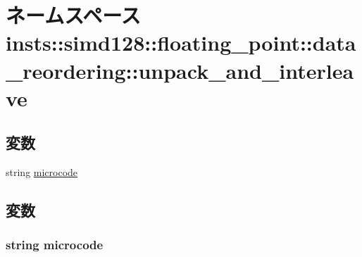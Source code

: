 \hypertarget{namespaceinsts_1_1simd128_1_1floating__point_1_1data__reordering_1_1unpack__and__interleave}{
\section{ネームスペース insts::simd128::floating\_\-point::data\_\-reordering::unpack\_\-and\_\-interleave}
\label{namespaceinsts_1_1simd128_1_1floating__point_1_1data__reordering_1_1unpack__and__interleave}
}
\subsection*{変数}
\begin{DoxyCompactItemize}
\item 
string \hyperlink{namespaceinsts_1_1simd128_1_1floating__point_1_1data__reordering_1_1unpack__and__interleave_a770f11a173e99389a8802f0107ed8f52}{microcode}
\end{DoxyCompactItemize}


\subsection{変数}
\hypertarget{namespaceinsts_1_1simd128_1_1floating__point_1_1data__reordering_1_1unpack__and__interleave_a770f11a173e99389a8802f0107ed8f52}{
\subsubsection[{microcode}]{\setlength{\rightskip}{0pt plus 5cm}string {\bf microcode}}}
\label{namespaceinsts_1_1simd128_1_1floating__point_1_1data__reordering_1_1unpack__and__interleave_a770f11a173e99389a8802f0107ed8f52}
